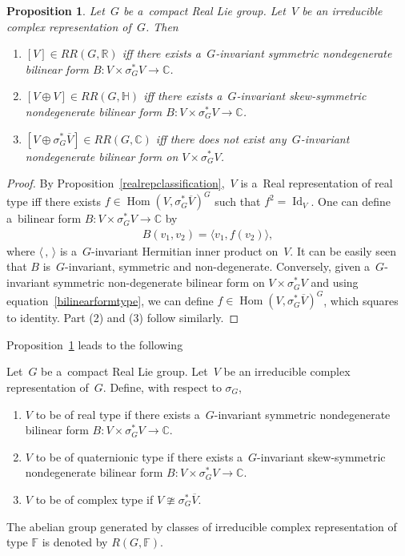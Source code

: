 \documentclass[11pt]{article}
\numberwithin{equation}{section}
\newtheorem{Proposition}[Theorem]{Proposition}
{\theoremstyle{definition}
\newtheorem{Definition}[Theorem]{Definition}
\newtheorem{Example}[Theorem]{Example}
\newtheorem{Remark}[Theorem]{Remark}
}
\DeclareMathOperator{\Hom}{Hom}
\DeclareMathOperator{\Id}{Id}
\begin{document}
\begin{Proposition}
\label{formclassification}
Let~$G$ be a~compact Real Lie group.
Let~$V$ be an irreducible complex representation of~$G$.
Then
\begin{enumerate}\itemsep=0pt
\item[$1.$]
$[V]\in RR(G, \mathbb{R})$ iff there exists a~$G$-invariant symmetric nondegenerate bilinear form $B: V\times
\sigma_G^*V\to\mathbb{C}$.
\item[$2.$]
$[V\oplus V]\in RR(G, \mathbb{H})$ iff there exists a~$G$-invariant skew-symmetric nondegenerate bilinear form $B:
V\times
\sigma_G^*V\to\mathbb{C}$.
\item[$3.$]
$[V\oplus
\sigma_G^*\overline{V}
]\in RR(G, \mathbb{C})$ iff there does not exist any~$G$-invariant nondegenerate bilinear form on $V\times
\sigma_G^*V$.
\end{enumerate}
\end{Proposition}
\begin{proof}
By Proposition~\ref{realrepclassification},~$V$ is a~Real representation of real type if\/f there exists
$f\in\Hom(V,
\sigma_G^*\overline{V})^G$ such that $f^2=\Id_V$.
One can def\/ine a~bilinear form $B: V\times
\sigma_G^*V\to\mathbb{C}$ by
\begin{gather}
\label{bilinearformtype}
B(v_1, v_2)=\langle v_1, f(v_2)\rangle,
\end{gather}
where $\langle \,, \,\rangle$ is a~$G$-invariant Hermitian inner product on~$V$.
It can be easily seen that $B$ is~$G$-invariant, symmetric and non-degenerate.
Conversely, given a~$G$-invariant symmetric non-degenerate bilinear form on $V\times
\sigma_G^*V$ and using equation~\eqref{bilinearformtype}, we can def\/ine $f\in\Hom(V,
\sigma_G^*\overline{V})^G$, which squares to identity.
Part (2) and (3) follow similarly.
\end{proof}
Proposition~\ref{formclassification} leads to the following

\begin{Definition}
\label{cplxrepclassification}
Let~$G$ be a~compact Real Lie group.
Let~$V$ be an irreducible complex representation of~$G$.
Def\/ine, with respect to $\sigma_G$,
\begin{enumerate}\itemsep=0pt
\item
$V$ to be of real type if there exists a~$G$-invariant symmetric nondegenerate bilinear form $B: V\times
\sigma_G^*V\to\mathbb{C}$.
\item
$V$ to be of quaternionic type if there exists a~$G$-invariant skew-symmetric nondegenerate bilinear form $B: V\times
\sigma_G^*V\to\mathbb{C}$.
\item
$V$ to be of complex type if $V\ncong
\sigma_G^*\overline{V}$.
\end{enumerate}
The abelian group generated by classes of irreducible complex representation of type $\mathbb{F}$ is denoted by $R(G,
\mathbb{F})$.
\end{Definition}
\end{document}
